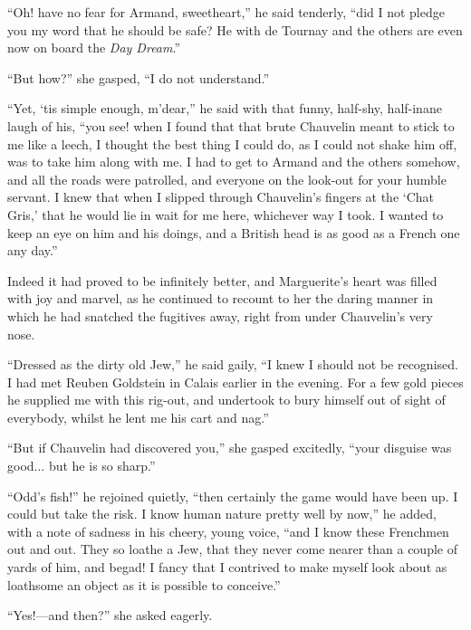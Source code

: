 \documentclass[paper=a5,BCOR=7mm,twoside,DIV=calc,12pt,usegeometry,chapterprefix,endperiod,headings=big]{scrbook}
\begin{document}
\enquote{Oh! have no fear for Armand, sweetheart,} he said tenderly, \enquote{did I not pledge you my word that he should be safe? He with de Tournay and the others are even now on board the \textit{Day Dream}.}

\enquote{But how?} she gasped, \enquote{I do not understand.}

\enquote{Yet, `tis simple enough, m'dear,} he said with that funny, half-shy, half-inane laugh of his, \enquote{you see! when I found that that brute Chauvelin meant to stick to me like a leech, I thought the best thing I could do, as I could not shake him off, was to take him along with me. I had to get to Armand and the others somehow, and all the roads were patrolled, and everyone on the look-out for your humble servant. I knew that when I slipped through Chauvelin's fingers at the \enquote{Chat Gris,} that he would lie in wait for me here, whichever way I took. I wanted to keep an eye on him and his doings, and a British head is as good as a French one any day.}

Indeed it had proved to be infinitely better, and Marguerite's heart was filled with joy and marvel, as he continued to recount to her the daring manner in which he had snatched the fugitives away, right from under Chauvelin's very nose.

\enquote{Dressed as the dirty old Jew,} he said gaily, \enquote{I knew I should not be recognised. I had met Reuben Goldstein in Calais earlier in the evening. For a few gold pieces he supplied me with this rig-out, and undertook to bury himself out of sight of everybody, whilst he lent me his cart and nag.}

\enquote{But if Chauvelin had discovered you,} she gasped excitedly, \enquote{your disguise was good... but he is so sharp.}

\enquote{Odd's fish!} he rejoined quietly, \enquote{then certainly the game would have been up. I could but take the risk. I know human nature pretty well by now,} he added, with a note of sadness in his cheery, young voice, \enquote{and I know these Frenchmen out and out. They so loathe a Jew, that they never come nearer than a couple of yards of him, and begad! I fancy that I contrived to make myself look about as loathsome an object as it is possible to conceive.}

\enquote{Yes!---and then?} she asked eagerly.
\end{document}
